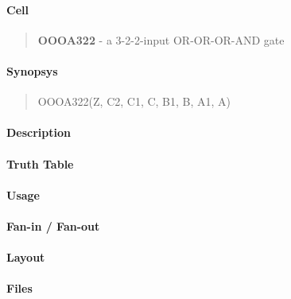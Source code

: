 \label{OOOA322}
\paragraph{Cell}
\begin{quote}
    \textbf{OOOA322} - a 3-2-2-input OR-OR-OR-AND gate
\end{quote}

\paragraph{Synopsys}
\begin{quote}
    OOOA322(Z, C2, C1, C, B1, B, A1, A)
\end{quote}

\paragraph{Description}

%

\paragraph{Truth Table}
%

\paragraph{Usage}

\paragraph{Fan-in / Fan-out}

\paragraph{Layout}

\paragraph{Files}
